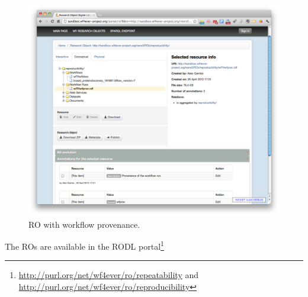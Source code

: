 \begin{figure}[h]
  \centering
  \includegraphics[width=\picwidth]{Figures/reproduce}
\caption{RO with workflow provenance.}
  \label{fig:reproduce}
\end{figure}


The ROs are available in the RODL
portal\footnote{\url{http://purl.org/net/wf4ever/ro/repeatability} and
  \url{http://purl.org/net/wf4ever/ro/reproducibility}}
